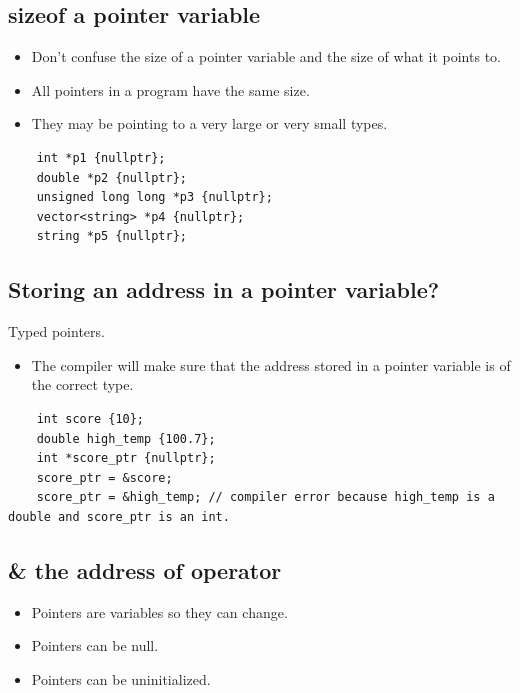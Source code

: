 \subsection{sizeof a pointer variable}
\begin{itemize}
    \item Don't confuse the size of a pointer variable and the size of what it points to.
    \item All pointers in a program have the same size.
    \item They may be pointing to a very large or very small types.
\end{itemize}
\begin{verbatim}
    int *p1 {nullptr};
    double *p2 {nullptr};
    unsigned long long *p3 {nullptr};
    vector<string> *p4 {nullptr};
    string *p5 {nullptr};
\end{verbatim}

\subsection{Storing an address in a pointer variable?}
Typed pointers.
\begin{itemize}
    \item The compiler will make sure that the address stored in a pointer variable is of the correct type.
\end{itemize}
\begin{verbatim}
    int score {10};
    double high_temp {100.7};
    int *score_ptr {nullptr};
    score_ptr = &score;
    score_ptr = &high_temp; // compiler error because high_temp is a double and score_ptr is an int.
\end{verbatim}

\subsection{\& the address of operator}
\begin{itemize}
    \item Pointers are variables so they can change.
    \item Pointers can be null.
    \item Pointers can be uninitialized.
\end{itemize}



